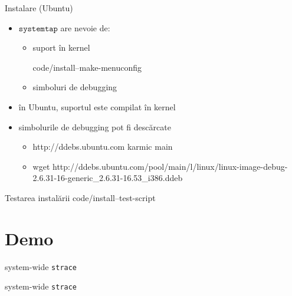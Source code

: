 \documentclass{beamer}
\newcommand{\systemtap}{$\texttt{systemtap}$ }
\begin{document}
\begin{frame}{Instalare (Ubuntu)}
  \begin{itemize}
    \item \systemtap are nevoie de:
      \begin{itemize} 
      \item suport în kernel
        \begin{beamerboxesrounded}[lower=block body,shadow=true]
          \small  {code/install--make-menuconfig}
        \end{beamerboxesrounded}
      \item simboluri de debugging
      \end{itemize}
    \item în Ubuntu, suportul este compilat în kernel
    \item simbolurile de debugging pot fi descărcate
      \begin{itemize}
      \item http://ddebs.ubuntu.com karmic main
      \item wget http://ddebs.ubuntu.com/pool/main/l/linux/linux-image-debug-2.6.31-16-generic\_2.6.31-16.53\_i386.ddeb
      \end{itemize}
  \end{itemize}
\end{frame}


\begin{frame}{Testarea instalării}
   {code/install--test-script}
\end{frame}


\section{Demo}

\begin{frame}{system-wide \texttt{strace}}
  \small 
\end{frame}

\begin{frame}{system-wide \texttt{strace}}
  \small 
\end{frame}
\end{document}

